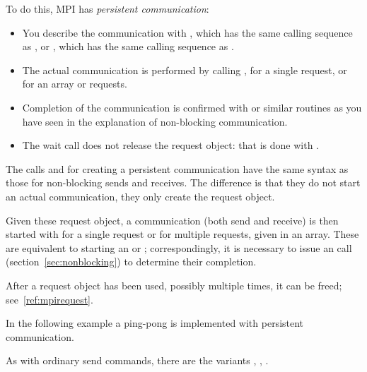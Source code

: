 To do this, MPI has \emph{persistent communication}:
\begin{itemize}
\item You describe the communication with
  , which has the same calling sequence as
  , or , which has the same
  calling sequence as .
\item The actual communication is performed by calling
  , for a single request, or
   for an array or requests.
\item Completion of the communication is confirmed with
   or similar routines as you have seen in the
  explanation of non-blocking communication.
\item The wait call does not release the request object: that is done
  with .
\end{itemize}

The calls  and 
for creating a persistent communication have the same syntax as 
those for non-blocking sends and receives. The difference is that they do not start
an actual communication, they only create the request object.
%
%
%

Given these request object, a communication (both send and receive) is then started
with  for a single request or  for 
multiple requests, given in an array.
%
%
%
These are equivalent to starting an  or
; correspondingly, it is necessary to issue an
 call (section~\ref{sec:nonblocking}) to
determine their completion.

After a request object has been used, possibly multiple times, it can
be freed; see~\ref{ref:mpirequest}.

In the following example a ping-pong is implemented with persistent communication.
%

As with ordinary send commands, there are the variants
,
,
.


